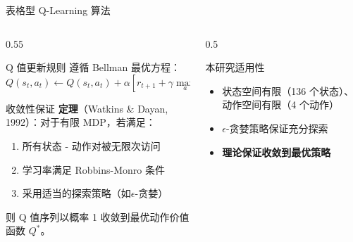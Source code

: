 \begin{frame}{表格型 Q-Learning 算法}
    \begin{columns}[T]
        \begin{column}{0.55\textwidth}
            \begin{block}{\normalsize Q 值更新规则}
                \footnotesize
                遵循 Bellman 最优方程：
                $$Q(s_t, a_t) \leftarrow Q(s_t, a_t) + \alpha \left[ r_{t+1} + \gamma \max_{a} Q(s_{t+1}, a) - Q(s_t, a_t) \right]$$
                
            \end{block}


            \begin{block}{\normalsize 收敛性保证}
                \footnotesize
                \textbf{定理}（Watkins \& Dayan, 1992）：对于有限 MDP，若满足：
                \begin{enumerate}
                    \item 所有状态 - 动作对被无限次访问
                    \item 学习率满足 Robbins-Monro 条件
                    \item 采用适当的探索策略（如$\epsilon$-贪婪）
                \end{enumerate}
                则 Q 值序列以概率 1 收敛到最优动作价值函数 $Q^*$。
            \end{block}
        \end{column}

        \begin{column}{0.5\textwidth}

            \begin{block}{\normalsize 本研究适用性}
                \footnotesize
                \begin{itemize}
                    \item 状态空间有限（136 个状态）、动作空间有限（4 个动作）
                    \item $\epsilon$-贪婪策略保证充分探索
                    \item \textbf{理论保证收敛到最优策略}
                \end{itemize}
            \end{block}
        \end{column}
    \end{columns}
\end{frame}

